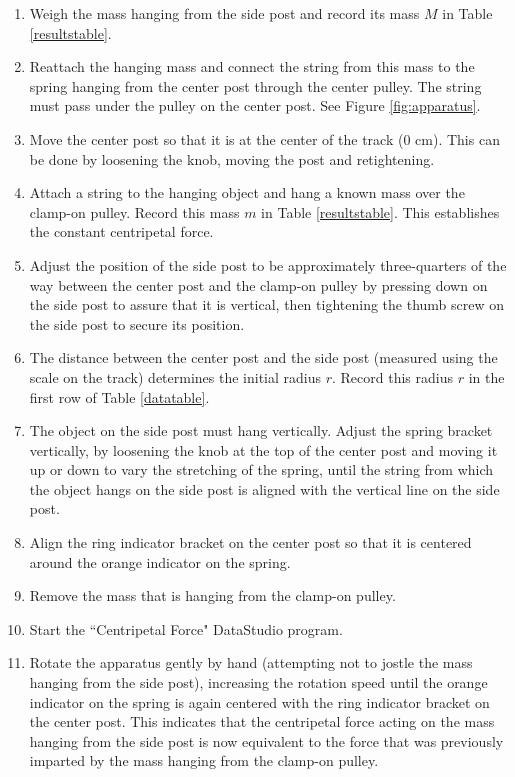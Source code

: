 \begin{enumerate}
	\item Weigh the mass hanging from the side post and record its mass $M$ in Table \ref{resultstable}.  
	\item Reattach the hanging mass and connect the string from this mass to the spring hanging from the center post through the center pulley. The string must pass under the pulley on the center post. See Figure \ref{fig:apparatus}.
	\item Move the center post so that it is at the center of the track (0 cm). This can be done by loosening the knob, moving the post and retightening.
	\item Attach a string to the hanging object and hang a known mass over the clamp-on pulley. Record this mass $m$ in Table \ref{resultstable}. This establishes the constant centripetal force.
	\item Adjust the position of the side post to be approximately three-quarters of the way between the center post and the clamp-on pulley by pressing down on the side post to assure that it is vertical, then tightening the thumb screw on the side post to secure its position.
	\item The distance between the center post and the side post (measured using the scale on the track) determines the initial radius $r$. Record this radius $r$ in the first row of Table \ref{datatable}.
	\item The object on the side post must hang vertically. Adjust the spring bracket vertically, by loosening the knob at the top of the center post and moving it up or down to vary the stretching of the spring, until the string from which the object hangs on the side post is aligned with the vertical line on the side post.
	\item Align the ring indicator bracket on the center post so that it is centered around the orange indicator on the spring.
	\item Remove the mass that is hanging from the clamp-on pulley.
	\item Start the ``Centripetal Force" DataStudio program.
	\item Rotate the apparatus gently by hand (attempting not to jostle the mass hanging from the side post), increasing the rotation speed until the orange indicator on the spring is again centered with the ring indicator bracket on the center post. This indicates that the centripetal force acting on the mass hanging from the side post is now equivalent to the force that was previously imparted by the mass hanging from the clamp-on pulley.

\end{enumerate}
